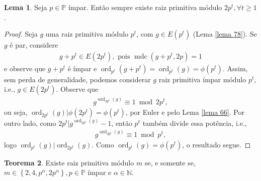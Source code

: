 \documentclass[a4paper,11pt,twoside, leqno]{article}
\DeclareMathOperator{\mdc}{mdc}
\DeclareMathOperator{\Ord}{ord}
\theoremstyle{definition}
\newtheorem{theorem}{Teorema}[section]
\newtheorem{lemma}[theorem]{Lema}
\begin{document}
\begin{lemma}
	\label{lema 79}
	Seja $p\in\mathbb{P}$ ímpar. Então sempre existe raiz primitiva módulo $2p^t, \forall t\geq 1$.
\end{lemma}
\begin{proof}
	Seja $g$ uma raiz primitiva módulo $p^t$, com $g\in E(p^t)$ (Lema \eqref{lema 78}). Se $g$ é par, considere
	\begin{align*}
	g + p^t\in E(2p^t), \text{ pois } \mdc(g+p^t, 2p) = 1
	\end{align*}
	e observe que $g+p^t$ é ímpar e $\Ord_{p^t}(g+p^t) = \Ord_{p^t}(g) = \phi(p^t)$. Assim, sem perda de generalidade, podemos considerar $g$ raiz primitiva ímpar módulo $p^t$, i.e., $g\in E(2p^t)$. Observe que 
	\begin{align*}
	g^{\Ord_{2p^t}(g)}\equiv 1\bmod 2p^t,
	\end{align*} 
	ou seja, $\Ord_{2p^t}(g)|\phi(2p^t) = \phi(p^t)$, por Euler e pelo Lema \eqref{lema 66}. Por outro lado, como $2p^t|g^{\Ord_{2p^t}(g)} - 1$, então $p^t$ também divide essa potência, i.e.,
	\begin{align*}
	g^{\Ord_{2p^t}(g)}\equiv 1\bmod p^t,
	\end{align*}
	logo $\Ord_{p^t}(g)|\Ord_{2p^t}(g)$. Como $\Ord_{p^t}(g) = \phi(p^t)$, o resultado segue.
\end{proof}
\begin{theorem}
	Existe raiz primitiva módulo $m$ se, e somente se, $m\in\left\{ 2,4,p^\alpha, 2p^\alpha  \right\}, p\in\mathbb{P}$ ímpar e $\alpha\in\mathbb{N}$.
\end{theorem}
\end{document}
